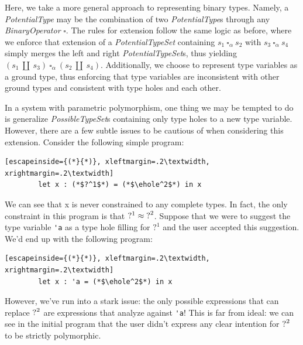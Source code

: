Here, we take a more general approach to representing binary types. Namely, a \emph{PotentialType} may be the combination of two \emph{PotentialType}s through any \emph{BinaryOperator} $\square$. The rules for extension follow the same logic as before, where we enforce that extension of a \emph{PotentialTypeSet} containing $s_1 ~\square_{\alpha}~ s_2$ with $s_3 ~\square_{\alpha}~ s_4$ simply merges the left and right \emph{PotentialTypeSet}s, thus yielding $(s_1 ~\amalg~ s_3) ~\square_{\alpha}~ (s_2 ~\amalg~ s_4)$. Additionally, we choose to represent type variables as a ground type, thus enforcing that type variables are inconsistent with other ground types and consistent with type holes and each other. 

In a system with parametric polymorphism, one thing we may be tempted to do is generalize \emph{PossibleTypeSet}s containing only type holes to a new type variable. However, there are a few subtle issues to be cautious of when considering this extension. Consider the following simple program:

\begin{center}
    \begin{lstlisting}[escapeinside={(*}{*)}, xleftmargin=.2\textwidth, xrightmargin=.2\textwidth]
        let x : (*$?^1$*) = (*$\ehole^2$*) in x
    \end{lstlisting}
\end{center}

We can see that x is never constrained to any complete types. In fact, the only constraint in this program is that $?^1 \approx \mathtt{?}^2$. Suppose that we were to suggest the type variable \lstinline{'a} as a type hole filling for $?^1$ and the user accepted this suggestion. We'd end up with the following program:

\begin{center}
    \begin{lstlisting}[escapeinside={(*}{*)}, xleftmargin=.2\textwidth, xrightmargin=.2\textwidth]
        let x : 'a = (*$\ehole^2$*) in x
    \end{lstlisting}
\end{center}

However, we've run into a stark issue: the only possible expressions that can replace $\mathtt{?}^2$ are expressions that analyze against \lstinline{'a}! This is far from ideal: we can see in the initial program that the user didn't express any clear intention for $\mathtt{?}^2$ to be strictly polymorphic.

